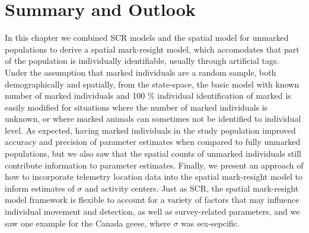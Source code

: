 



\section{Summary and Outlook}
In this chapter we combined SCR models and the spatial model for unmarked populations to derive a spatial mark-resight model, which accomodates that part of the population is individually identifiable, usually through artificial tags. Under the assumption that marked individuals are a random sample, both demographically and spatially, from the state-space, the basic model with known number of marked individuals and 100 \% individual identification of marked is easily modified for situations where the number of marked individuals is unknown, or where marked animals can sometimes not be identified to individual level. As expected, having marked individuals in the study population improved accuracy and precision of parameter estimates when compared to fully unmarked populations, but we also saw that the spatial counts of unmarked individuals still contribute information to parameter estimates. Finally, we present an approach of how to incorporate telemetry location data into the spatial mark-resight model to inform estimates of $\sigma$ and activity centers. Just as SCR, the spatial mark-resight model framework is flexible to account for a variety of factors that may influence individual movement and detection, as well as survey-related parameters, and we saw one example for the Canada geese, where $\sigma$ was sex-sepcific.

